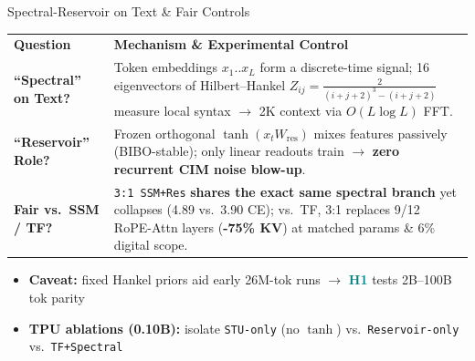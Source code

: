 \documentclass[aspectratio=169,10pt]{beamer}
\newcommand{\accentt}[1]{\textcolor{Teal}{\textbf{#1}}}
\begin{document}
\begin{frame}{Spectral-Reservoir on Text \& Fair Controls}
  \vspace*{0.12cm}
  \begin{center}
  \footnotesize
  \setlength{\tabcolsep}{5.5pt}
  \renewcommand{\arraystretch}{1.42}
  \begin{tabular}{@{}L{3.15cm}L{10.15cm}@{}}
    \textbf{\color{Teal}Question} & \textbf{\color{Teal}Mechanism \& Experimental Control} \\
    \midrule
    \textbf{``Spectral'' on Text?} &
    Token embeddings $x_1..x_L$ form a discrete-time signal; 16 eigenvectors of Hilbert--Hankel $Z_{ij}=\tfrac{2}{(i+j+2)^3-(i+j+2)}$ measure local syntax $\to$ 2K context via $O(L\log L)$ FFT. \\
    \midrule
    \textbf{``Reservoir'' Role?} &
    Frozen orthogonal $\tanh(x_t W_{\mathrm{res}})$ mixes features passively (BIBO-stable); only linear readouts train $\to$ \textbf{zero recurrent CIM noise blow-up}. \\
    \midrule
    \textbf{Fair vs.\ SSM / TF?} &
    \texttt{3:1 SSM+Res} \textbf{shares the exact same spectral branch} yet collapses (4.89 vs.\ 3.90 CE); vs.\ TF, 3:1 replaces 9/12 RoPE-Attn layers (\textbf{-75\% KV}) at matched params \& 6\% digital scope. \\
    \bottomrule
  \end{tabular}
  \end{center}
  \vspace*{0.28cm}
  \begin{itemize}\setlength{\itemsep}{0.44em}
    \item {\small \textbf{Caveat:} fixed Hankel priors aid early 26M-tok runs $\to$ \accentt{H1} tests 2B--100B tok parity}
    \item {\small \textbf{TPU ablations (0.10B):} isolate \texttt{STU-only} (no $\tanh$) vs.\ \texttt{Reservoir-only} vs.\ \texttt{TF+Spectral}}
  \end{itemize}
\end{frame}
\end{document}
